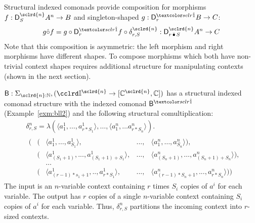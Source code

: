 \noindent
Structural indexed comonads provide composition for morphisms
$f : \D^{\sclrd{n}}_{S} A^n \rightarrow B$ and singleton-shaped $g : \D^\sunit_r B \rightarrow C$:
$$
g \hat{\circ} f = g \circ \D^{\sunit}_r f \circ \delta^{\sclrd{n}}_{r,S} 
: \D^{\sclrd{n}}_{r \bbullet S} A^n \rightarrow C
$$
Note that this composition is asymmetric: the left morphism and right morphisms 
have different shapes. To compose morphisms which both have
non-trivial context shapes requires additional structure for manipulating contexts
(shown in the next section). 

\begin{example}
$\BLL :\Sigma_{\sclrd{n} : \mathbb{N}}, (\Icat^{\sclrd{n}} \rightarrow [\mathbb{C}^{\sclrd{n}}, \mathbb{C}])$ has a structural indexed comonad structure with the indexed comonad $\BLL^\sunit$ (Example~\ref{exm:bll2}) and the following structural comultiplication: 
\arraycolsep=1pt\def\arraystretch{0.4}
\begin{align*}
& \delta^n_{r,S} = \lambda (\langle{a^1_1, \ldots, a^1_{r \ast S_1}}\rangle, \ldots, \langle{a^n_1, \ldots a^n_{r \ast S_n}}\rangle) . \\[-0.3em]
& \begin{array}{lllll}
    ( &  ( &   \langle{a^1_1, \ldots, a^1_{S_1}}\rangle, & ..., & \langle{a^n_1,\ldots, a^n_{S_n}}\rangle ), \\[0.3em]
            &  ( &   \langle{a^1_{(S_1 + 1)}, ..., a^1_{(S_1+1) + S_1}}\rangle, & ..., & \langle{a^n_{(S_n + 1)}, \ldots, a^n_{(S_n+1) + S_n}}\rangle ), \\[0.6em]
            &  & \ldots  \\[0.2em]
            &  ( &   \langle{a^1_{(r - 1) \ast s_1 + 1}, .., a^1_{r \ast S_1}}\rangle, & ..., & \langle{a^n_{(r - 1) \ast S_n + 1}, ..., a^n_{r \ast S_n}}\rangle ) ) 
   \end{array}
\end{align*}
%
The input is an $n$-variable context 
containing $r$ times $S_i$ copies of $a^i$ for each variable. The output
has $r$ copies of a single $n$-variable context containing $S_i$ copies of $a^i$ for each variable. Thus,
$\delta^n_{r,S}$ partitions the incoming context into $r$-sized contexts. 
\label{exm:bll3}
\end{example}

